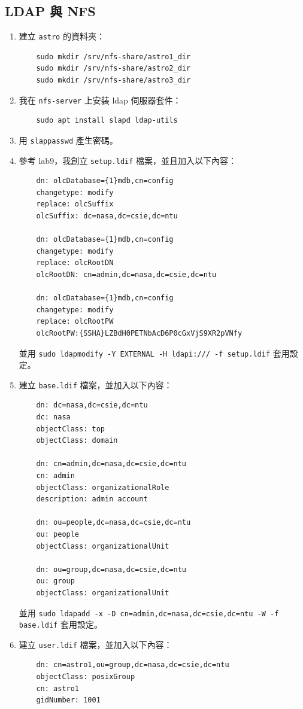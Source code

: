 \documentclass[12pt]{article}
\begin{document}
\subsection{LDAP 與 NFS}
\begin{enumerate}
  \item 建立 \texttt{astro} 的資料夾：
  \begin{verbatim}
    sudo mkdir /srv/nfs-share/astro1_dir
    sudo mkdir /srv/nfs-share/astro2_dir
    sudo mkdir /srv/nfs-share/astro3_dir
  \end{verbatim}
  \item 我在 \texttt{nfs-server} 上安裝 ldap 伺服器套件：
  \begin{verbatim}
    sudo apt install slapd ldap-utils
  \end{verbatim}
  \item 用 \texttt{slappasswd} 產生密碼。
  \item 參考 lab9，我創立 \texttt{setup.ldif} 檔案，並且加入以下內容：
  \begin{verbatim}
    dn: olcDatabase={1}mdb,cn=config
    changetype: modify
    replace: olcSuffix
    olcSuffix: dc=nasa,dc=csie,dc=ntu

    dn: olcDatabase={1}mdb,cn=config
    changetype: modify
    replace: olcRootDN
    olcRootDN: cn=admin,dc=nasa,dc=csie,dc=ntu

    dn: olcDatabase={1}mdb,cn=config
    changetype: modify
    replace: olcRootPW
    olcRootPW:{SSHA}LZBdH0PETNbAcD6P0cGxVjS9XR2pVNfy
  \end{verbatim}
  並用 \texttt{sudo ldapmodify -Y EXTERNAL -H ldapi:/// -f setup.ldif} 套用設定。
  \clearpage
  \item 建立 \texttt{base.ldif} 檔案，並加入以下內容：
  \begin{verbatim}
    dn: dc=nasa,dc=csie,dc=ntu
    dc: nasa
    objectClass: top
    objectClass: domain

    dn: cn=admin,dc=nasa,dc=csie,dc=ntu
    cn: admin
    objectClass: organizationalRole
    description: admin account

    dn: ou=people,dc=nasa,dc=csie,dc=ntu
    ou: people
    objectClass: organizationalUnit

    dn: ou=group,dc=nasa,dc=csie,dc=ntu
    ou: group
    objectClass: organizationalUnit
  \end{verbatim}
  並用 \texttt{sudo ldapadd -x -D cn=admin,dc=nasa,dc=csie,dc=ntu -W -f base.ldif} 套用設定。
  \item 建立 \texttt{user.ldif} 檔案，並加入以下內容：
  \begin{verbatim}
    dn: cn=astro1,ou=group,dc=nasa,dc=csie,dc=ntu
    objectClass: posixGroup
    cn: astro1
    gidNumber: 1001


\end{verbatim}
\end{enumerate}
\end{document}
